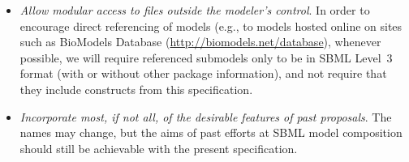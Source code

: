 \begin{itemize}
\item \emph{Allow modular access to files outside the modeler's
    control}.  In order to encourage direct referencing of models (e.g.,
  to models hosted online on sites such as BioModels Database
  (\url{http://biomodels.net/database}), whenever possible, we will
  require referenced submodels only to be in SBML Level~3 format (with
  or without other package information),
  and not require that they include constructs from this specification.

\item \emph{Incorporate most, if not all, of the desirable features of
    past proposals}. The names may change, but the aims of past efforts
  at SBML model composition should still be achievable with the present
  specification.

\end{itemize}

